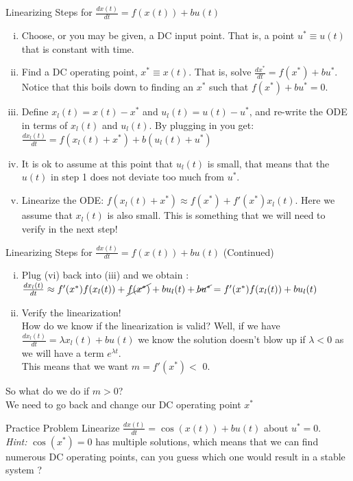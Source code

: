 \documentclass{beamer}
\begin{document}
\begin{frame}{Linearizing Steps for $\frac{dx(t)}{dt} = f(x(t)) + bu(t)$}
\begin{enumerate}[(i)]
\item Choose, or you may be given, a DC input point. That is, a point $u^* \equiv u(t)$ that is constant with time.\pause \\
\item Find a DC operating point, $x^* \equiv x(t)$. That is, solve $\frac{dx^*}{dt} = f(x^*) + bu^*$. Notice that this boils down to finding an $x^*$ such that $f(x^*) + bu^* = 0 $. \pause \\
\item Define $x_l(t) = x(t) - x^*$ and $u_l(t) = u(t) - u^*$, and re-write the ODE in terms of $ x_l(t)$ and $ u_l(t)$. By plugging in you get: $\frac{dx_l(t)}{dt} = f(x_l(t) + x^*) + b(u_l(t)+ u^*)$ \pause \\
\item It is ok to assume at this point that $u_l(t)$ is small, that means that the $u(t)$ in step 1 does not deviate too much from $u^*$.\pause \\
\item Linearize the ODE: $f(x_l(t) + x^*) \approx f(x^*) + f'(x^*)x_l(t)$. Here we assume that $x_l(t)$ is also small. This is something that we will need to verify in the next step!
\end{enumerate}
\end{frame}
\begin{frame}{Linearizing Steps for $\frac{dx(t)}{dt} = f(x(t)) + bu(t)$ (Continued)}
\begin{enumerate}[(vi)]
\item Plug (vi) back into  (iii) and we obtain : $\frac{dx_l(t)}{dt} \approx f'(x^*)f(x_l(t)) + \cancel{f(x^*)} + bu_l(t)+ \cancel{bu^*} = f'(x^*)f(x_l(t))+ bu_l(t)$
\item Verify the linearization! \\
How do we know if the linearization is valid? \pause Well, if we have $\frac{dx_l(t)}{dt} = \lambda x_l(t) + bu(t)$ we know the solution doesn't blow up if $\lambda < 0$ as we will have a term $e^{\lambda t}$.
\\ This means that we want $m = f'(x^*) <$  0. 
\end{enumerate} \pause
So what do we do if $m>0 $? \pause \\
We need to go back and change our DC operating point $x^*$
\end{frame}
\begin{frame}{Practice Problem}
Linearize $\frac{dx(t)}{dt} = \cos(x(t)) + bu(t)$ about $u^* = 0$. \pause \\
\textit{Hint:} $\cos(x^*) = 0$ has multiple solutions, which means that we can find numerous DC operating points, can you guess which one would result in a stable system ? 
\end{frame}
\end{document}
